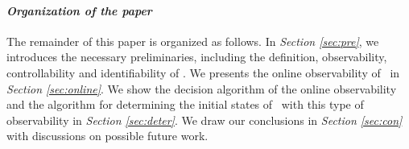 






\paragraph*{\em Organization of the paper}
The remainder of this paper is organized as follows.
 In {\em Section \ref{sec:pre}}, we  introduces the necessary preliminaries, including the definition, observability, controllability and identifiability of \BCNs. We presents  the  online  observability of \BCNs\ in {\em Section \ref{sec:online}}. We show  the  decision  algorithm of the online observability and the algorithm for determining the initial states of \BCNs\ with this type of observability in {\em Section \ref{sec:deter}}.  We draw our conclusions in  {\em Section \ref{sec:con}} with discussions on possible future work.

